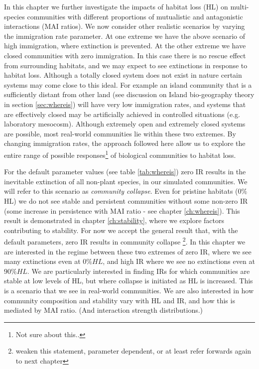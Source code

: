 In this chapter we further investigate the impacts of habitat loss (HL)  on multi-species communities with different proportions of mutualistic and antagonistic interactions (MAI ratios). We now consider other realistic scenarios by varying the immigration rate parameter. At one extreme we have the above scenario of high immigration, where extinction is prevented. At the other extreme we have closed communities with zero immigration. In this case there is no rescue effect from surrounding habitats, and we may expect to see extinctions in response to habitat loss. Although a totally closed system does not exist in nature certain systems may come close to this ideal. For example an island community that is a sufficiently distant from other land (see discussion on Island bio-geography theory in section \ref{sec:whereis}) will have very low immigration rates, and systems that are effectively closed may be artificially achieved in controlled situations (e.g. laboratory mesocosm). Although extremely open and extremely closed systems are possible, most real-world communities lie within these two extremes. By changing immigration rates, the approach followed here allow us to explore the entire range of possible responses\footnote{Not sure about this..} of biological communities to habitat loss.

For the default parameter values (see table \ref{tab:whereis}) zero IR results in the inevitable extinction of all non-plant species, in our simulated communities. We will refer to this scenario as \emph{community collapse}. Even for pristine habitats ($0\%$ HL) we do not see stable and persistent communities without some non-zero IR (some increase in persistence with MAI ratio - see chapter \ref{ch:whereis}). This result is demonstrated in chapter \ref{ch:stability}, where we explore factors contributing to stability. For now we accept the general result that, with the default parameters, zero IR results in community collapse \footnote{weaken this statement, parameter dependent, or at least refer forwards again to next chapter}. In this chapter we are interested in the regime between these two extremes of zero IR, where we see many extinctions even at $0\% HL$, and high IR where we see no extinctions even at $90\% HL$. We are particularly interested in finding IRs for which communities are stable at low levels of HL, but where collapse is initiated as HL is increased. This is a scenario that we see in real-world communities. We are also interested in how community composition and stability vary with HL and IR, and how this is mediated by MAI ratio. (And interaction strength distributions.)

